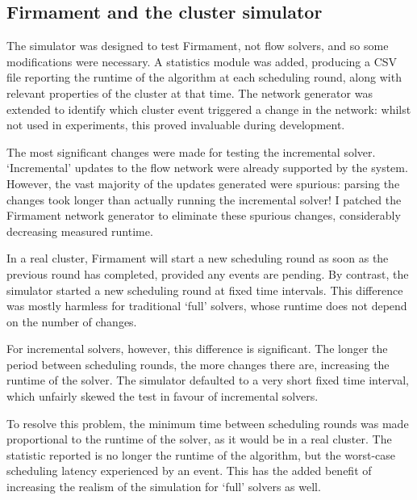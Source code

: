 \subsection{Firmament and the cluster simulator}

The simulator was designed to test Firmament, not flow solvers, and so some modifications were necessary. A statistics module was added, producing a CSV file reporting the runtime of the algorithm at each scheduling round, along with relevant properties of the cluster at that time. The network generator was extended to identify which cluster event triggered a change in the network: whilst not used in experiments, this proved invaluable during development.


The most significant changes were made for testing the incremental solver. `Incremental' updates to the flow network were already supported by the system. However, the vast majority of the updates generated were spurious: parsing the changes took longer than actually running the incremental solver! I patched the Firmament network generator to eliminate these spurious changes, considerably decreasing measured runtime.

In a real cluster, Firmament will start a new scheduling round as soon as the previous round has completed, provided any events are pending. By contrast, the simulator started a new scheduling round at fixed time intervals. This difference was mostly harmless for traditional `full' solvers, whose runtime does not depend on the number of changes. 

For incremental solvers, however, this difference is significant. The longer the period between scheduling rounds, the more changes there are, increasing the runtime of the solver. The simulator defaulted to a very short fixed time interval, which unfairly skewed the test in favour of incremental solvers. 

To resolve this problem, the minimum time between scheduling rounds was made proportional to the runtime of the solver, as it would be in a real cluster. The statistic reported is no longer the runtime of the algorithm, but the worst-case scheduling latency experienced by an event\footnotemark. This has the added benefit of increasing the realism of the simulation for `full' solvers as well.

